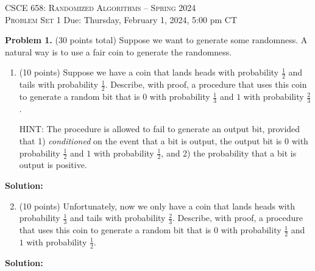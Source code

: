 \documentclass[11pt]{article}
\begin{document}
\begin{center}
{\Large\textsc{CSCE 658: Randomized Algorithms -- Spring 2024 \\ 
Problem Set 1}}
\vskip 0.1in
Due: Thursday, February 1, 2024, 5:00 pm CT
\end{center}


\noindent
\textbf{Problem 1.} (30 points total)
Suppose we want to generate some randomness. 
A natural way is to use a fair coin to generate the randomness. 
\begin{enumerate}
\item (10 points)
Suppose we have a coin that lands heads with probability $\frac{1}{2}$ and tails with probability $\frac{1}{2}$. 
Describe, with proof, a procedure that uses this coin to generate a random bit that is $0$ with probability $\frac{1}{3}$ and $1$ with probability $\frac{2}{3}$.

\noindent
HINT: The procedure is allowed to fail to generate an output bit, provided that 1) \emph{conditioned} on the event that a bit is output, the output bit is $0$ with probability $\frac{1}{2}$ and $1$ with probability $\frac{1}{2}$, and 2) the probability that a bit is output is positive.  
\end{enumerate}

\noindent\textbf{Solution:}













\begin{enumerate}
\setcounter{enumi}{1}
\item (10 points)
Unfortunately, now we only have a coin that lands heads with probability $\frac{1}{3}$ and tails with probability $\frac{2}{3}$. 
Describe, with proof, a procedure that uses this coin to generate a random bit that is $0$ with probability $\frac{1}{2}$ and $1$ with probability $\frac{1}{2}$.
\end{enumerate}

\noindent\textbf{Solution:}
\end{document}
